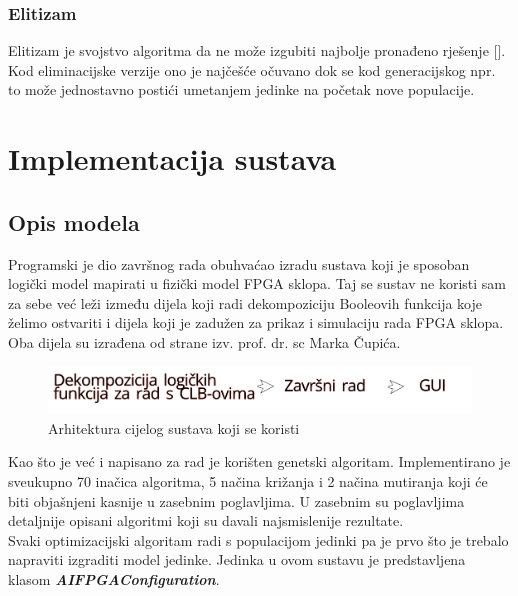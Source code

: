 \documentclass[times, utf8, zavrsni]{fer}
\begin{document}
	\subsection{Elitizam}
	\label{elitizam}
	
	Elitizam je svojstvo algoritma da ne može izgubiti najbolje pronađeno rješenje [\citep{UI}]. Kod eliminacijske verzije ono je najčešće očuvano dok se kod generacijskog npr. to može jednostavno postići umetanjem jedinke na početak nove populacije.
	
	
	\chapter{Implementacija sustava}
	
	\section{Opis modela}
	
	Programski je dio završnog rada obuhvaćao izradu sustava koji je sposoban logički model mapirati u fizički model FPGA sklopa. Taj se sustav ne koristi sam za sebe već leži između dijela koji radi dekompoziciju Booleovih funkcija koje želimo ostvariti i dijela koji je zadužen za prikaz i simulaciju rada FPGA sklopa. Oba dijela su izrađena od strane izv. prof. dr. sc Marka Čupića. 
	
	\begin{figure}[!htb]
		\centering
		\includegraphics[width=15cm]{slike/arhitekturaSustava.png}
		\caption{Arhitektura cijelog sustava koji se koristi}
		\label{fig:arh-sustav}
	\end{figure}
	
	Kao što je već i napisano za rad je korišten genetski algoritam. Implementirano je sveukupno 70 inačica algoritma, 5 načina križanja i 2 načina mutiranja koji će biti objašnjeni kasnije u zasebnim poglavljima. U zasebnim su poglavljima detaljnije opisani algoritmi koji su davali najsmislenije rezultate. \\
	Svaki optimizacijski algoritam radi s populacijom jedinki pa je prvo što je trebalo napraviti izgraditi model jedinke. Jedinka u ovom sustavu je predstavljena klasom \textbf{\emph{AIFPGAConfiguration}}. 
	
\end{document}
